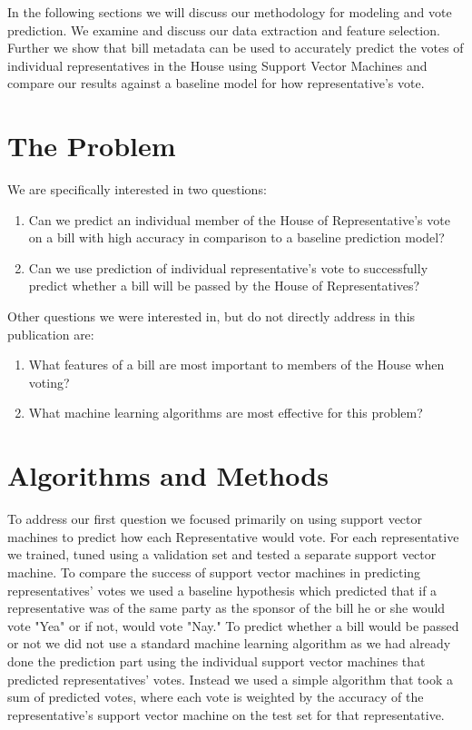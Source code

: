 \documentclass[11pt,letterpaper,twocolumn]{article}
\begin{document}
	In the following sections we will discuss our methodology for modeling and vote prediction. We examine and discuss our data extraction and feature selection. Further we show that bill metadata can be used to accurately predict the votes of individual representatives in the House using Support Vector Machines and compare our results against a baseline model for how representative's vote. 

\section{The Problem}
We are specifically interested in two questions: 
\begin{enumerate}
\item Can we predict an individual member of the House of Representative's vote on a bill with high accuracy in comparison to a baseline prediction model?
\item Can we use prediction of individual representative's vote to successfully predict whether a bill will be passed by the House of Representatives?
\end{enumerate}

\noindent Other questions we were interested in, but do not directly address in this publication are:

\begin{enumerate}
\item What features of a bill are most important to members of the House when voting?
\item What machine learning algorithms are most effective for this problem?
\end{enumerate}

\section{Algorithms and Methods}
To address our first question we focused primarily on using support vector machines to predict how each Representative would vote. For each representative we trained, tuned using a validation set and tested a separate support vector machine. To compare the success of support vector machines in predicting representatives' votes we used a baseline hypothesis which predicted that if a representative was of the same party as the sponsor of the bill he or she would vote "Yea" or if not, would vote "Nay." To predict whether a bill would be passed or not we did not use a standard machine learning algorithm as we had already done the prediction part using the individual support vector machines that predicted representatives' votes. Instead we used a simple algorithm that took a sum of predicted votes, where each vote is weighted by the accuracy of the representative's support vector machine on the test set for that representative. 
\end{document}

